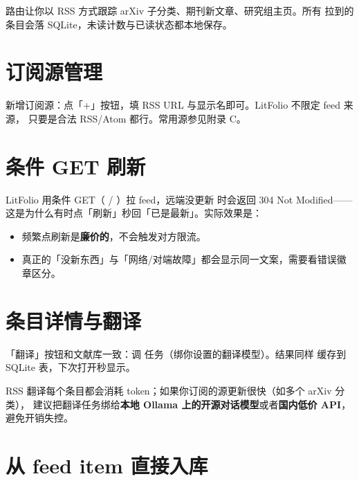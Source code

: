  路由让你以 RSS 方式跟踪 arXiv 子分类、期刊新文章、研究组主页。所有
拉到的条目会落 SQLite，未读计数与已读状态都本地保存。

\section{订阅源管理}


新增订阅源：点「+」按钮，填 RSS URL 与显示名即可。LitFolio 不限定 feed 来源，
只要是合法 RSS/Atom 都行。常用源参见附录 C。

\section{条件 GET 刷新}

LitFolio 用条件 GET（ / ）拉 feed，远端没更新
时会返回 304 Not Modified——这是为什么有时点「刷新」秒回「已是最新」。实际效果是：

\begin{itemize}
  \item 频繁点刷新是\textbf{廉价的}，不会触发对方限流。
  \item 真正的「没新东西」与「网络/对端故障」都会显示同一文案，需要看错误徽章区分。
\end{itemize}

\section{条目详情与翻译}


「翻译」按钮和文献库一致：调  任务（绑你设置的翻译模型）。结果同样
缓存到 SQLite  表，下次打开秒显示。

\begin{warnbox}
RSS 翻译每个条目都会消耗 token；如果你订阅的源更新很快（如多个 arXiv 分类），
建议把翻译任务绑给\textbf{本地 Ollama 上的开源对话模型}或者\textbf{国内低价 API}，
避免开销失控。
\end{warnbox}

\section{从 feed item 直接入库}

